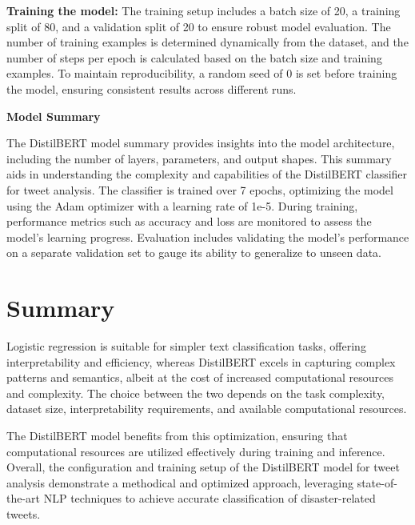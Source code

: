 \textbf{Training the model:}
The training setup includes a batch size of 20, a training split of 80, and a validation split of 20 to ensure robust model evaluation.
The number of training examples is determined dynamically from the dataset, and the number of steps per epoch is calculated based on the batch size and training examples. To maintain reproducibility, a random seed of 0 is set before training the model, ensuring consistent results across different runs.

\textbf{Model Summary}

The DistilBERT model summary provides insights into the model architecture, including the number of layers, parameters, and output shapes.
This summary aids in understanding the complexity and capabilities of the DistilBERT classifier for tweet analysis.
The classifier is trained over 7 epochs, optimizing the model using the Adam optimizer with a learning rate of 1e-5.
During training, performance metrics such as accuracy and loss are monitored to assess the model's learning progress.
Evaluation includes validating the model's performance on a separate validation set to gauge its ability to generalize to unseen data.


\section{Summary}
Logistic regression is suitable for simpler text classification tasks, offering interpretability and efficiency, whereas DistilBERT excels in capturing complex patterns and semantics, albeit at the cost of increased computational resources and complexity. The choice between the two depends on the task complexity, dataset size, interpretability requirements, and available computational resources.

The DistilBERT model benefits from this optimization, ensuring that computational resources are utilized effectively during training and inference.
Overall, the configuration and training setup of the DistilBERT model for tweet analysis demonstrate a methodical and optimized approach, leveraging state-of-the-art NLP techniques to achieve accurate classification of disaster-related tweets.




